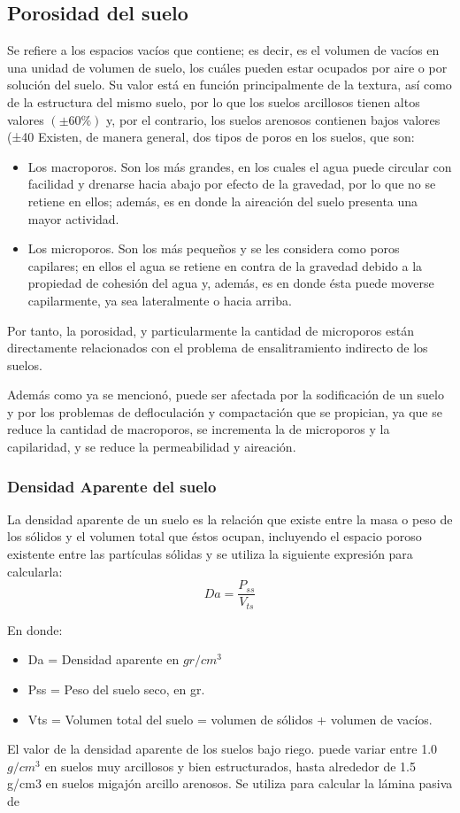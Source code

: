 \subsection{Porosidad del suelo}
Se refiere a los espacios vacíos que contiene; es decir, es el volumen de vacíos en
una unidad de volumen de suelo, los cuáles pueden estar ocupados por aire o por
solución del suelo. Su valor está en función principalmente de la textura, así como
de la estructura del mismo suelo, por lo que los suelos arcillosos tienen altos valores
$(\pm 60\%)$ y, por el contrario, los suelos arenosos contienen bajos valores (±40%
Existen, de manera general, dos tipos de poros en los suelos, que son:
\begin{itemize}
  \item Los macroporos. Son los más grandes, en los cuales el agua puede circular con facilidad y drenarse hacia abajo por efecto de la gravedad, por lo que no se retiene en ellos; además, es en donde la aireación del suelo presenta una mayor actividad.
  \item Los microporos. Son los más pequeños y se les considera como poros capilares; en ellos el agua se retiene en contra de la gravedad debido a la propiedad de cohesión del agua y, además, es en donde ésta puede moverse capilarmente, ya sea lateralmente o hacia arriba.
\end{itemize}
Por tanto, la porosidad, y particularmente la cantidad de microporos están directamente relacionados con el problema de ensalitramiento indirecto de los suelos.

Además como ya se mencionó, puede ser afectada por la sodificación de un suelo y por los problemas de defloculación y compactación que se propician, ya que se reduce la cantidad de macroporos, se incrementa la de microporos y la capilaridad, y se reduce la permeabilidad y aireación.

\subsubsection{Densidad Aparente del suelo}
La densidad aparente de un suelo es la relación que existe entre la masa o peso de los sólidos y el volumen total que éstos ocupan, incluyendo el espacio poroso existente entre las partículas sólidas y se utiliza la siguiente expresión para calcularla:
\begin{equation}
  Da = \frac{P_{ss}}{V_{ts}} 
\end{equation}
\begin{notation}
  En donde:
  \begin{itemize}
    \item Da = Densidad aparente en $gr/cm^3$
    \item Pss = Peso del suelo seco, en gr.
    \item Vts = Volumen total del suelo = volumen de sólidos + volumen de vacíos.
  \end{itemize}
\end{notation}
El valor de la densidad aparente de los suelos bajo riego. puede variar entre 1.0 $g/cm^3$ en suelos muy arcillosos y bien estructurados, hasta alrededor de 1.5 g/cm3 en suelos migajón arcillo arenosos. Se utiliza para calcular la lámina pasiva de
